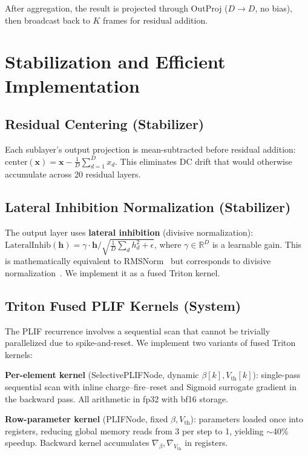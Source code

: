 \documentclass{article}
\newcommand{\vth}{V_{\text{th}}}
\newcommand{\R}{\mathbb{R}}
\begin{document}
After aggregation, the result is projected through OutProj ($D \to D$, no bias), then broadcast back to $K$ frames for residual addition.

\section{Stabilization and Efficient Implementation}
\label{sec:implementation}

\subsection{Residual Centering (Stabilizer)}
\label{sec:residual-centering}

Each sublayer's output projection is mean-subtracted before residual addition:
$\text{center}(\mathbf{x}) = \mathbf{x} - \frac{1}{D} \sum_{d=1}^{D} x_d$.
This eliminates DC drift that would otherwise accumulate across 20 residual layers.

\subsection{Lateral Inhibition Normalization (Stabilizer)}
\label{sec:lateral-inhibition}

The output layer uses \textbf{lateral inhibition} (divisive normalization):
$\text{LateralInhib}(\mathbf{h}) = \gamma \cdot \mathbf{h} / \sqrt{\frac{1}{D}\sum_d h_d^2 + \epsilon}$,
where $\gamma \in \R^D$ is a learnable gain.
This is mathematically equivalent to RMSNorm~\citep{zhang2019root} but corresponds to divisive normalization~\citep{carandini2012normalization}.
We implement it as a fused Triton kernel.

\subsection{Triton Fused PLIF Kernels (System)}
\label{sec:triton}

The PLIF recurrence involves a sequential scan that cannot be trivially parallelized due to spike-and-reset.
We implement two variants of fused Triton~\citep{tillet2019triton} kernels:

\textbf{Per-element kernel} (SelectivePLIFNode, dynamic $\beta[k], \vth[k]$): single-pass sequential scan with inline charge--fire--reset and Sigmoid surrogate gradient in the backward pass. All arithmetic in fp32 with bf16 storage.

\textbf{Row-parameter kernel} (PLIFNode, fixed $\beta, \vth$): parameters loaded once into registers, reducing global memory reads from 3 per step to 1, yielding $\sim$40\% speedup. Backward kernel accumulates $\nabla_\beta, \nabla_{\vth}$ in registers.
\end{document}
